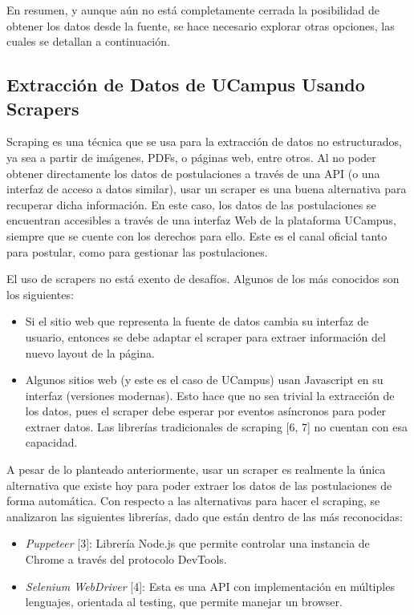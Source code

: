 En resumen, y aunque aún no está completamente cerrada la posibilidad de obtener
los datos desde la fuente, se hace necesario explorar otras opciones, las cuales
se detallan a continuación.

\subsection{Extracción de Datos de UCampus Usando Scrapers}

Scraping es una técnica que se usa para la extracción de datos no estructurados,
ya sea a partir de imágenes, PDFs, o páginas web, entre otros. Al no poder
obtener directamente los datos de postulaciones a través de una API (o una
interfaz de acceso a datos similar), usar un scraper es una buena alternativa
para recuperar dicha información. En este caso, los datos de las postulaciones
se encuentran accesibles a través de una interfaz Web de la plataforma UCampus,
siempre que se cuente con los derechos para ello. Este es el canal oficial tanto
para postular, como para gestionar las postulaciones.

El uso de scrapers no está exento de desafíos. Algunos de los más conocidos son
los siguientes: 

\begin{itemize}
    \item Si el sitio web que representa la fuente de datos cambia su interfaz
    de usuario, entonces se debe adaptar el scraper para extraer información del
    nuevo layout de la página.
    \item Algunos sitios web (y este es el caso de UCampus) usan Javascript en
    su interfaz (versiones modernas). Esto hace que no sea trivial la extracción
    de los datos, pues el scraper debe esperar por eventos asíncronos para poder
    extraer datos. Las librerías tradicionales de scraping [6, 7] no cuentan con
    esa capacidad.
\end{itemize}

A pesar de lo planteado anteriormente, usar un scraper es realmente la única
alternativa que existe hoy para poder extraer los datos de las postulaciones de
forma automática. Con respecto a las alternativas para hacer el scraping, se
analizaron las siguientes librerías, dado que están dentro de las más
reconocidas:

\begin{itemize}
    \item \emph{Puppeteer} [3]: Librería Node.js que permite controlar una instancia de
    Chrome a través del protocolo DevTools.
    \item \emph{Selenium WebDriver} [4]: Esta es una API con implementación en
    múltiples lenguajes, orientada al testing, que permite manejar un browser.
\end{itemize}

